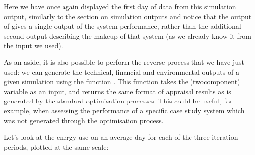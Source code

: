 \documentclass[letterpaper,10pt,english]{sphinxmanual}
\begin{document}
\begin{DUlineblock}{0em}
\item[] 
\end{DUlineblock}

\sphinxAtStartPar
Here we have once again displayed the first day of data from this
simulation output, similarly to  the section on simulation outputs
and notice
that the output of  gives a
single output of the system performance, rather than the additional
second output describing the makeup of that system (as we already know
it from the input we used).

\sphinxAtStartPar
As an aside, it is also possible to perform the reverse process that we
have just used: we can generate the technical, financial and
environmental outputs of a given simulation using the function
. This
function takes the (two\sphinxhyphen{}component) variable 
as an input, and returns the same format of appraisal results as is
generated by the standard optimisation processes. This could be useful,
for example, when assessing the performance of a specific case study
system which was not generated through the optimisation process.

\sphinxAtStartPar
Let’s look at the energy use on an average day for each of the three
iteration periods, plotted at the same scale:
\end{document}
